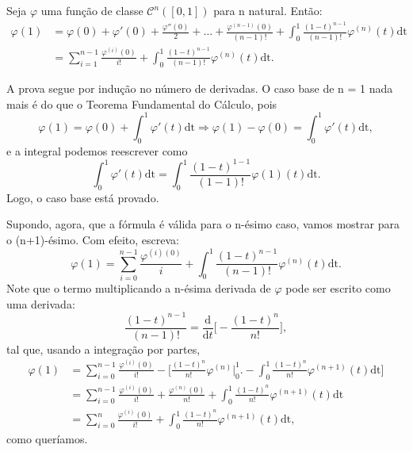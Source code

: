 \documentclass[../analysisII_notes.tex]{subfiles}
\begin{document}
\hypertarget{lemma_taylor}{
	\begin{lemma*}
		Seja \(\varphi \) uma função de classe \(\mathcal{C}^{n}([0, 1])\) para n natural. Então:
		\begin{align*}
			\varphi (1) & = \varphi (0) +\varphi '(0) + \frac{\varphi ''(0)}{2} + \dotsc + \frac{\varphi^{(n-1)}(0)}{(n-1)!} + \int_{0}^{1}\frac{(1-t)^{n-1}}{(n-1)!}\varphi^{(n)}(t) \mathrm{dt} \\
			            & = \sum\limits_{i=1}^{n-1}\frac{\varphi^{(i)}(0)}{i!} + \int_{0}^{1}\frac{(1-t)^{n-1}}{(n-1)!}\varphi^{(n)}(t) \mathrm{dt}.
		\end{align*}
	\end{lemma*}
}
\begin{proof*}
	A prova segue por indução no número de derivadas. O caso base de n = 1 nada mais é do que o Teorema Fundamental do Cálculo, pois
	\[
		\varphi (1) = \varphi (0) + \int_{0}^{1}\varphi '(t) \mathrm{dt} \Rightarrow \varphi (1)-\varphi (0) = \int_{0}^{1}\varphi '(t) \mathrm{dt},
	\]
	e a integral podemos reescrever como
	\[
		\int_{0}^{1}\varphi '(t) \mathrm{dt} = \int_{0}^{1}\frac{(1-t)^{1-1}}{(1-1)!}\varphi (1)(t) \mathrm{dt}.
	\]
	Logo, o caso base está provado.

	Supondo, agora, que a fórmula é válida para o n-ésimo caso, vamos mostrar para o (n+1)-ésimo. Com efeito, escreva:
	\[
		\varphi (1) = \sum\limits_{i=0}^{n-1}\frac{\varphi^{(i)(0)}}{i} + \int_{0}^{1}\frac{(1-t)^{n-1}}{(n-1)!}\varphi^{(n)}(t) \mathrm{dt}.
	\]
	Note que o termo multiplicando a n-ésima derivada de \(\varphi \) pode ser escrito como uma derivada:
	\[
		\frac{(1-t)^{n-1}}{(n-1)!} = \frac{\mathrm{d}}{\mathrm{d}t}\biggl[-\frac{(1-t)^{n}}{n!}\biggr],
	\]
	tal que, usando a integração por partes,
	\begin{align*}
		\varphi (1) & = \sum\limits_{i=0}^{n-1}\frac{\varphi^{(i)}(0)}{i!} - \biggl[\frac{(1-t)^{n}}{n!}\varphi^{(n)}\biggl|_{0}^{1}\biggr. - \int_{0}^{1}\frac{(1-t)^{n}}{n!}\varphi^{(n+1)}(t) \mathrm{dt}\biggr] \\
		            & = \sum\limits_{i=0}^{n-1}\frac{\varphi^{(i)}(0)}{i!} + \frac{\varphi^{(n)}(0)}{n!}+\int_{0}^{1}\frac{(1-t)^{n}}{n!}\varphi^{(n+1)}(t) \mathrm{dt}                                             \\
		            & = \sum\limits_{i=0}^{n}\frac{\varphi^{(i)}(0)}{i!} +\int_{0}^{1}\frac{(1-t)^{n}}{n!}\varphi^{(n+1)}(t) \mathrm{dt},
	\end{align*}
	como queríamos. \qedsymbol
\end{proof*}
\end{document}
